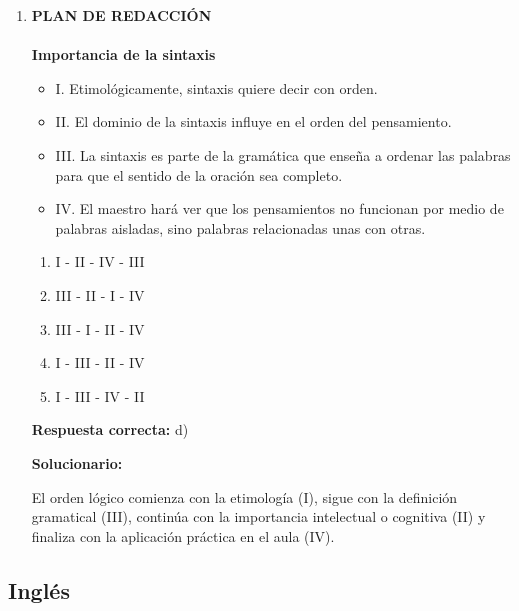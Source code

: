 \begin{enumerate}[resume]
	\item \textbf{PLAN DE REDACCIÓN}\\
	\\
	\textbf{Importancia de la sintaxis}
	\begin{itemize}[label={}]
		\item I. Etimológicamente, sintaxis quiere decir con orden.
		\item II. El dominio de la sintaxis influye en el orden del pensamiento.
		\item III. La sintaxis es parte de la gramática que enseña a ordenar las palabras para que el sentido de la oración sea completo.
		\item IV. El maestro hará ver que los pensamientos no funcionan por medio de palabras aisladas, sino palabras relacionadas unas con otras.
	\end{itemize}
	\begin{enumerate}[label=\alph*)]
		\item I - II - IV - III
		\item III - II - I - IV
		\item III - I - II - IV
		\item I - III - II - IV
		\item I - III - IV - II
	\end{enumerate}
	\textbf{Respuesta correcta:} d)

	\vspace{2mm}
	\textbf{Solucionario:}

	El orden lógico comienza con la etimología (I), sigue con la definición gramatical (III), continúa con la importancia intelectual o cognitiva (II) y finaliza con la aplicación práctica en el aula (IV).

	\vspace{6mm}
\end{enumerate}


\subsection*{Inglés}

